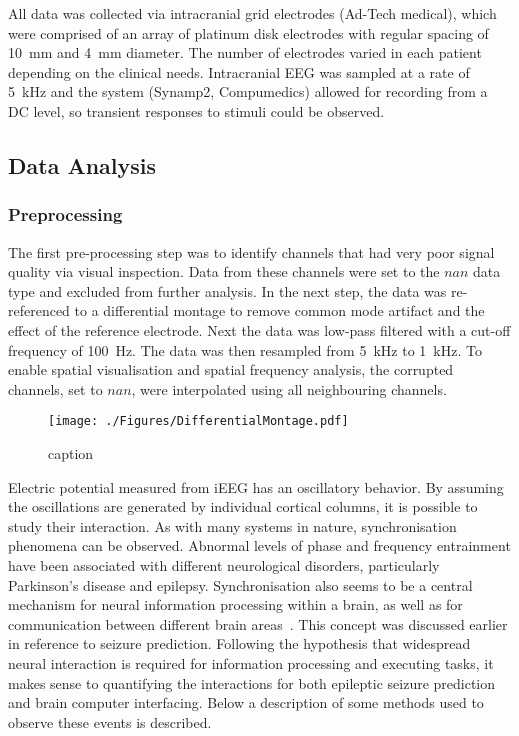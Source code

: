 \documentclass[]{article}
\begin{document}
All data was collected via intracranial grid electrodes (Ad-Tech medical), which were comprised of an array of platinum disk electrodes with regular spacing of 10~mm and 4~mm diameter. The number of electrodes varied in each patient depending on the clinical needs. Intracranial EEG was sampled at a rate of 5~kHz and the system (Synamp2, Compumedics) allowed for recording from a DC level, so transient responses to stimuli could be observed.

\subsection{Data Analysis}
\subsubsection{Preprocessing}
The first pre-processing step was to identify channels that had very poor signal quality via visual inspection. Data from these channels were set to the $nan$ data type and excluded from further analysis. In the next step, the data was re-referenced to a differential montage to remove common mode artifact and the effect of the reference electrode. Next the data was low-pass filtered with a cut-off frequency of 100~Hz. The data was then resampled from 5~kHz to 1~kHz. To enable spatial visualisation and spatial frequency analysis, the corrupted channels, set to $nan$, were interpolated using all neighbouring channels.

\begin{figure}[htbp]
	\centering
		\texttt{[image: ./Figures/DifferentialMontage.pdf]}
	\caption{caption}
	\label{fig:DifMontage}
\end{figure}

Electric potential measured from iEEG has
an oscillatory behavior. By assuming the oscillations are generated
by individual cortical columns, it is possible to study their
interaction. As with many systems in nature, synchronisation
phenomena can be observed. Abnormal levels of phase and frequency
entrainment have been associated with different neurological
disorders, particularly Parkinson's disease and epilepsy.
Synchronisation also seems to be a central mechanism for neural
information processing within a brain, as well as for communication
between different brain areas~\cite{Rosenblum2001}. This concept
was discussed earlier in reference to seizure prediction. Following
the hypothesis that widespread neural interaction is required for
information processing and executing tasks, it makes sense to
quantifying the interactions for both epileptic seizure prediction
and brain computer interfacing. Below a description of some methods
used to observe these events is described.\\
\end{document}

